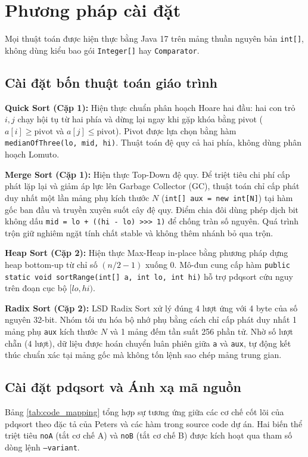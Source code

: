 \documentclass[conference]{IEEEtran}
\begin{document}
\section{Phương pháp cài đặt}

Mọi thuật toán được hiện thực bằng Java 17 trên mảng thuần nguyên bản \texttt{int[]}, không dùng kiểu bao gói \texttt{Integer[]} hay \texttt{Comparator}.

\subsection{Cài đặt bốn thuật toán giáo trình}
\textbf{Quick Sort (Cặp 1):} Hiện thực chuẩn phân hoạch Hoare hai đầu: hai con trỏ $i, j$ chạy hội tụ từ hai phía và dừng lại ngay khi gặp khóa bằng pivot ($a[i] \ge \text{pivot}$ và $a[j] \le \text{pivot}$). Pivot được lựa chọn bằng hàm \texttt{medianOfThree(lo, mid, hi)}. Thuật toán đệ quy cả hai phía, không dùng phân hoạch Lomuto.

\textbf{Merge Sort (Cặp 1):} Hiện thực Top-Down đệ quy. Để triệt tiêu chi phí cấp phát lặp lại và giảm áp lực lên Garbage Collector (GC), thuật toán chỉ cấp phát duy nhất một lần mảng phụ kích thước $N$ (\texttt{int[] aux = new int[N]}) tại hàm gốc ban đầu và truyền xuyên suốt cây đệ quy. Điểm chia đôi dùng phép dịch bit không dấu \texttt{mid = lo + ((hi - lo) >>> 1)} để chống tràn số nguyên. Quá trình trộn giữ nghiêm ngặt tính chất stable và không thêm nhánh bỏ qua trộn.

\textbf{Heap Sort (Cặp 2):} Hiện thực Max-Heap in-place bằng phương pháp dựng heap bottom-up từ chỉ số $(n/2 - 1)$ xuống $0$. Mô-đun cung cấp hàm \texttt{public static void sortRange(int[] a, int lo, int hi)} hỗ trợ pdqsort cứu nguy trên đoạn cục bộ $[lo, hi)$.

\textbf{Radix Sort (Cặp 2):} LSD Radix Sort xử lý đúng 4 lượt ứng với 4 byte của số nguyên 32-bit. Nhóm tối ưu hóa bộ nhớ phụ bằng cách chỉ cấp phát duy nhất 1 mảng phụ \texttt{aux} kích thước $N$ và 1 mảng đếm tần suất 256 phần tử. Nhờ số lượt chẵn ($4$ lượt), dữ liệu được hoán chuyển luân phiên giữa \texttt{a} và \texttt{aux}, tự động kết thúc chuẩn xác tại mảng gốc mà không tốn lệnh sao chép mảng trung gian.

\subsection{Cài đặt pdqsort và Ánh xạ mã nguồn}
Bảng \ref{tab:code_mapping} tổng hợp sự tương ứng giữa các cơ chế cốt lõi của pdqsort theo đặc tả của Peters \cite{peters2021pdqsort} và các hàm trong source code dự án. Hai biến thể triệt tiêu \texttt{noA} (tắt cơ chế A) và \texttt{noB} (tắt cơ chế B) được kích hoạt qua tham số dòng lệnh \texttt{--variant}.
\end{document}
